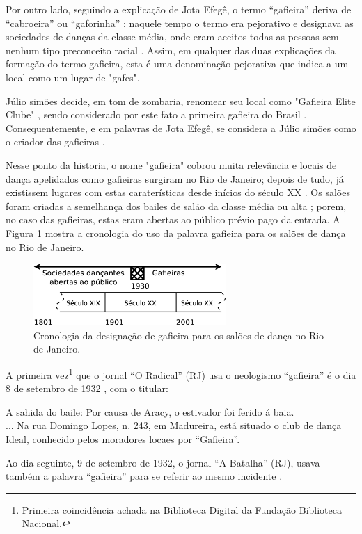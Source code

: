 Por outro lado, seguindo a explicação de Jota Efegê, 
o termo ``gafieira'' deriva de ``cabroeira'' ou ``gaforinha'' \cite[pp. 3]{juliosimoes};
naquele tempo o termo era pejorativo e designava as sociedades de danças da classe média,
onde eram aceitos todas as pessoas sem nenhum tipo preconceito racial \cite[pp. 18]{entrevistajuliojournalbrasil1}.
Assim, em qualquer das duas explicações da formação do termo gafieira, 
esta é uma denominação pejorativa que indica a um local como um lugar de "gafes".

Júlio simões decide, em tom de zombaria, renomear seu local como "Gafieira Elite Clube" \cite[pp. 79]{moura1995tia},
sendo considerado por este fato a primeira gafieira do Brasil \cite{cabral2016elisete} \cite[pp. 84]{cabral1996escolas}.
Consequentemente, e em palavras de Jota Efegê, 
se considera a Júlio simões como o criador das gafieiras \cite[pp. 3]{juliosimoes}.

Nesse ponto da historia, 
o nome "gafieira" cobrou muita relevância e locais de dança apelidados como gafieiras surgiram no Rio de Janeiro;
depois de tudo, já existissem lugares com estas caraterísticas desde inícios do século XX \cite[pp. 49]{diniz2003almanaque}.
Os salões foram criadas a semelhança dos bailes de salão da classe média ou alta \cite[pp. 78]{coutinho2006cronistas}; 
porem, no caso das gafieiras, estas eram abertas ao público prévio pago da entrada.
A Figura \ref{fig:gafieiracrono} mostra a cronologia do uso da palavra gafieira para os salões de dança no Rio de Janeiro.
\begin{figure}[h]
  \centering
    \includegraphics[width=0.65\textwidth]{chapters/cap-intro/gafieira-crono.eps}
  \caption{Cronologia da designação de gafieira para os salões de dança no Rio de Janeiro.}
  \label{fig:gafieiracrono}
\end{figure}

A primeira vez\footnote{Primeira coincidência achada na Biblioteca Digital da Fundação Biblioteca Nacional.} 
que o jornal ``O Radical'' (RJ) usa o neologismo ``gafieira'' 
é o dia 8 de setembro de 1932 \cite[pp. 12]{gafieirajournaloradical1},
com o titular:
\begin{tcolorbox}[breakable,colback=lowgray,colframe=lowgray]%
A sahida do baile: Por causa de Aracy, o estivador foi ferido á baia.\\
... Na rua Domingo Lopes, n. 243, em Madureira, está situado o club de dança Ideal, 
conhecido pelos moradores locaes por ``Gafieira''.
\end{tcolorbox} 
Ao dia seguinte, 9 de setembro de 1932, o jornal ``A Batalha'' (RJ), 
usava também a palavra ``gafieira'' para se referir ao mesmo incidente \cite[pp. 8]{gafieirajournalabatalha1}.

